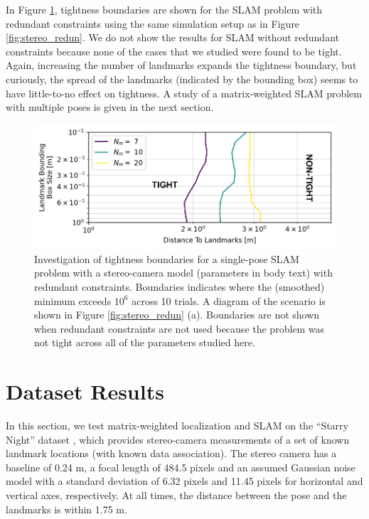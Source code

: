 \documentclass[lettersize,journal]{IEEEtran}
\newcommand{\rev}[1]{\color{red}{#1}\color{black}}
\begin{document}
In Figure \ref{fig:stereo_slam_redun}, tightness boundaries are shown for the SLAM problem with redundant constraints using the same simulation setup as in Figure \ref{fig:stereo_redun}. We do not show the results for SLAM without redundant constraints because none of the cases that we studied were found to be tight. Again, increasing the number of landmarks expands the tightness boundary, but curiously, the spread of the landmarks (indicated by the bounding box) seems to have little-to-no effect on tightness. A study of a matrix-weighted SLAM problem with multiple poses is given in the next section.

\begin{figure}[!h]
	\centering
	\includegraphics[width=\columnwidth]{figs/slam_lms_redun}
	\caption{Investigation of tightness boundaries for a single-pose SLAM problem with a stereo-camera model (parameters in body text) with redundant constraints. Boundaries indicates where the (smoothed) minimum \rev{ER } exceeds $ 10^{6}$ across 10 trials. A diagram of the scenario is shown in Figure \ref{fig:stereo_redun} (a). Boundaries are not shown when redundant constraints are not used because the problem was not tight across all of the parameters studied here.}
	\label{fig:stereo_slam_redun}
\end{figure}


\section{Dataset Results}\label{sec:Dataset}

In this section, we test matrix-weighted localization and SLAM on the ``Starry Night'' dataset \cite{barfoot2011state}, which provides stereo-camera measurements of a set of known landmark locations (with known data association). The stereo camera has a baseline of 0.24 m, a focal length of 484.5 pixels and an assumed Gaussian noise model with a standard deviation of 6.32 pixels and 11.45 pixels for horizontal and vertical axes, respectively. At all times, the distance between the pose and the landmarks is within 1.75 m.
\end{document}

